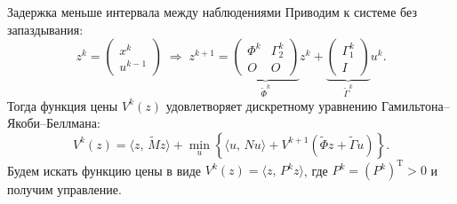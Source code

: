         \begin{frame}{Задержка меньше интервала между наблюдениями}
                Приводим к системе без запаздывания:
$$
        z^k = \begin{pmatrix} x^k\\u^{k-1} \end{pmatrix}
        \;\Longrightarrow\;
        z^{k+1} = \underbrace{\begin{pmatrix}
\Phi^k & \Gamma_2^k\\
O & O
        \end{pmatrix}}_{\tilde \Phi^k}
        z^k + \underbrace{
        \begin{pmatrix}
\Gamma_1^k \\
I
        \end{pmatrix}
        }_{\tilde\Gamma^k} u^k.
$$
                Тогда функция цены $V^k(z)$ удовлетворяет дискретному уравнению Гамильтона--Якоби--Беллмана:
                $$
V^k(z) = \langle z,\,\tilde M z\rangle
+
\min\limits_{u}
\left\{
\langle
u,\,N u
\rangle
+
V^{k+1}(\tilde\Phi z + \tilde\Gamma u)
\right\}.
                $$
                Будем искать функцию цены в виде $V^k(z) = \langle z,\,P^k z \rangle$, где $P^k = (P^k)^{\mathrm{T}} > 0$ и получим управление.
        \end{frame}

